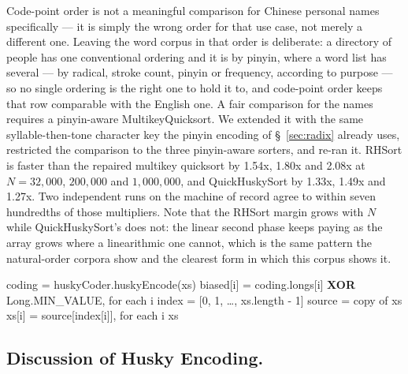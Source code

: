\documentclass[twoside,leqno,twocolumn]{article}
\begin{document}
Code-point order is not a meaningful comparison for Chinese personal names specifically —
it is simply the wrong order for that use case, not merely a different one.
Leaving the word corpus in that order is deliberate: a directory of people has one conventional
ordering and it is by pinyin, where a word list has several --- by radical, stroke count, pinyin or
frequency, according to purpose --- so no single ordering is the right one to hold it to,
and code-point order keeps that row comparable with the English one.
A fair comparison for the names requires a pinyin-aware MultikeyQuicksort.
We extended it with the same syllable-then-tone character key the pinyin encoding of \S~\ref{sec:radix} already uses,
restricted the comparison to the three pinyin-aware sorters, and re-ran it.
RHSort is faster than the repaired multikey quicksort by 1.54x, 1.80x and 2.08x at $N = 32{,}000$,
$200{,}000$ and $1{,}000{,}000$, and QuickHuskySort by 1.33x, 1.49x and 1.27x.
Two independent runs on the machine of record agree to within seven hundredths of those multipliers.
Note that the RHSort margin grows with $N$ while QuickHuskySort's does not:
the linear second phase keeps paying as the array grows where a linearithmic one cannot,
which is the same pattern the natural-order corpora show and the clearest form in which this corpus
shows it.

\begin{algorithm2e}
 coding = huskyCoder.huskyEncode(xs) 
 biased[i] = coding.longs[i] {\bf XOR} Long.MIN\_VALUE, for each i\;
 index = [0, 1, \ldots, xs.length - 1]\;
 source = copy of xs\;
 xs[i] = source[index[i]], for each i\;
 \Return xs\;
 \caption{RadixHuskySort.sort. The digit passes reorder only \textit{index}, an \textit{int[]}, so
   the payload is permuted once at the end rather than once per digit.}
 \label{alg:radixhuskysort}
\end{algorithm2e}


\subsection{Discussion of Husky Encoding.}
\label{sec:coding}
\end{document}
